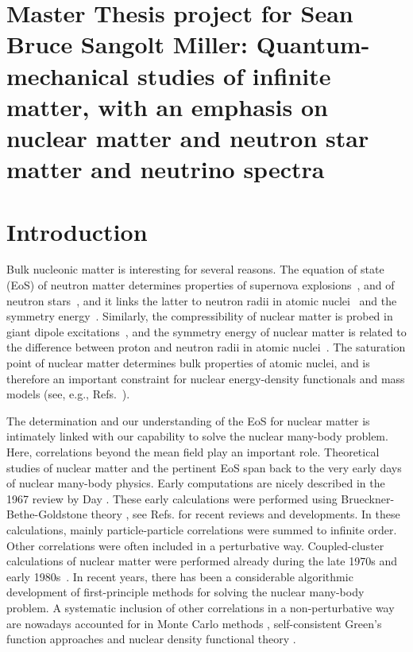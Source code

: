 \documentclass[aps,prc,twocolumn,showpacs,floatfix,nofootinbib,preprintnumbers,superscriptaddress,amsmath,amssymb]{revtex4-1}
\begin{document}
\pagestyle{plain}

\section*{Master Thesis project for Sean Bruce Sangolt Miller: Quantum-mechanical studies of infinite matter, with an emphasis on nuclear matter and neutron star matter and neutrino spectra}


\section{Introduction}

Bulk nucleonic matter is interesting for several reasons. The equation of state (EoS) of
neutron matter determines properties of supernova
explosions~\cite{burrows2013}, and of neutron
stars~\cite{weber1999,hh2000,lattimer2007,sammarruca2010,lattimer2012,hebeler2012f},
and it links the latter to neutron radii in atomic
nuclei~\cite{brown2000,horowitz2001,gandolfi2012} and the symmetry
energy~\cite{tsang2012,steiner2012}. Similarly, the compressibility of
nuclear matter is probed in giant dipole
excitations~\cite{shlomo1993}, and the symmetry energy of nuclear
matter is related to the difference between proton and neutron radii
in atomic nuclei~\cite{abrahamyan2012,reinhard2013,erler2013}. The
saturation point of nuclear matter determines bulk properties of
atomic nuclei, and is therefore an important constraint for nuclear
energy-density functionals and mass models (see,
e.g., Refs.~\cite{kortelainen2010,lunney2003}).

The determination and our understanding of the EoS for nuclear matter
is intimately linked with our capability to solve the nuclear
many-body problem. Here, correlations beyond the mean field play an
important role.  Theoretical studies of nuclear matter and the
pertinent EoS span back to the very early days of nuclear many-body
physics. Early computations are nicely described in the 1967 review by
Day \cite{day1967}. These early calculations were performed using
Brueckner-Bethe-Goldstone theory \cite{brueckner1954,brueckner1955},
see Refs.\cite{hh2000,baldo2012,baldo2012a,baardsen2014} for recent reviews and
developments.  In these calculations, mainly particle-particle
correlations were summed to infinite order.  Other correlations were
often included in a perturbative way. Coupled-cluster calculations of
nuclear matter were performed already during the late 1970s and early
1980s~\cite{kummel1978,day1981}. In recent years, there has been a
considerable algorithmic development of first-principle methods for
solving the nuclear many-body problem. A systematic inclusion of other
correlations in a non-perturbative way are nowadays accounted for in
Monte Carlo methods
\cite{carlson2003,gandolfi2009,gezerlis2010,lovato2012,gezerlis2013},
self-consistent Green's function approaches
\cite{dickhoff2004,soma2008, soma2012, baldo2012a,carbone2013} and
nuclear density functional theory \cite{lunney2003,erler2013}.
\end{document}
